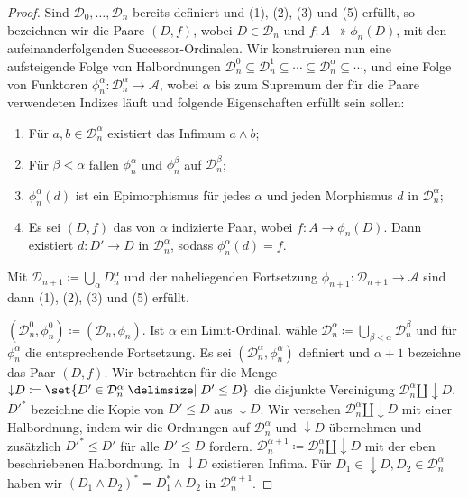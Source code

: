 \documentclass[a4paper, parskip=half,11pt]{scrartcl}
\theoremstyle{marginbreak}
\theoremstyle{nonumberplain}
\newtheorem{proof}{Beweis.}
\newcommand\cat\mathcal
\newcommand{\down}[1]{{\downarrow}#1}
\begin{document}
{\begin{proof}
			Sind $\cat{D}_0,\ldots,\cat{D}_n$ bereits definiert und (1), (2), (3)
			und (5) erfüllt, so bezeichnen wir die Paare $(D, f)$, wobei $D\in\cat{D}_n$
			und $f\colon A\twoheadrightarrow \phi_n(D)$, mit den aufeinanderfolgenden
			Successor-Ordinalen. Wir konstruieren nun eine aufsteigende Folge von
			Halbordnungen $\cat{D}_n^0\subseteq\cat{D}_n^1\subseteq\cdots\subseteq\cat{D}_n^\alpha\subseteq\cdots$,
			und eine Folge von Funktoren $\phi_n^\alpha\colon\cat{D}_n^\alpha\to\cat{A}$,
			wobei $\alpha$ bis zum Supremum der für die Paare verwendeten Indizes läuft und
			folgende Eigenschaften erfüllt sein sollen:
			\begin{enumerate}[label=(\alph*),noitemsep]
				\item Für $a, b\in\cat{D}_n^\alpha$ existiert das Infimum $a\wedge b$;
				\item Für $\beta<\alpha$ fallen $\phi_n^\alpha$ und $\phi_n^\beta$ auf $\cat{D}_n^\beta$;
				\item $\phi_n^\alpha(d)$ ist ein Epimorphismus für jedes $\alpha$ und jeden
					Morphismus $d$ in $\cat{D}_n^\alpha$;
				\item Es sei $(D, f)$ das von $\alpha$ indizierte Paar, wobei
					$f\colon A\to\phi_n(D)$. Dann existiert $d\colon D'\to D$ in
					$\cat{D}_n^\alpha$, sodass $\phi_n^\alpha(d) = f$.
			\end{enumerate}
			Mit $\cat{D}_{n+1}\coloneqq\bigcup_\alpha D_n^\alpha$ und der naheliegenden
			Fortsetzung $\phi_{n+1}\colon\cat{D}_{n+1}\to\cat{A}$ sind dann (1), (2), (3)
			und (5) erfüllt.

			$(\cat{D}_n^0, \phi_n^0)\coloneqq (\cat{D}_n, \phi_n)$. Ist $\alpha$ ein
			Limit-Ordinal, wähle $\cat{D}_n^\alpha\coloneqq\bigcup_{\beta<\alpha}\cat{D}_n^\beta$
			und für $\phi_n^\alpha$ die entsprechende Fortsetzung. Es sei $(\cat{D}_n^\alpha,
			\phi_n^\alpha)$ definiert und $\alpha+1$ bezeichne das Paar $(D, f)$.
			Wir betrachten für die Menge $\down{D}\coloneqq\set{D'\in\cat{D}_n^\alpha\given D'\leq D}$
			die disjunkte Vereinigung $\cat{D}_n^\alpha\amalg\down{D}$. $D'^*$
			bezeichne die Kopie von $D'\leq D$ aus $\down{D}$. Wir versehen
			$\cat{D}_n^\alpha\amalg\down{D}$ mit einer Halbordnung, indem wir die
			Ordnungen auf $\cat{D}_n^\alpha$ und $\down{D}$ übernehmen und zusätzlich
			$D'^*\leq D'$ für alle $D'\leq D$ fordern. $\cat{D}_n^{\alpha+1}\coloneqq
			\cat{D}_n^\alpha\amalg\down{D}$ mit der eben beschriebenen Halbordnung.
			In $\down{D}$ existieren Infima. Für $D_1\in\down{D}, D_2\in\cat{D}_n^\alpha$
			haben wir $(D_1\wedge D_2)^*=D_1^*\wedge D_2$ in $\cat{D}_n^{\alpha+1}$.


\end{proof}}
\end{document}
